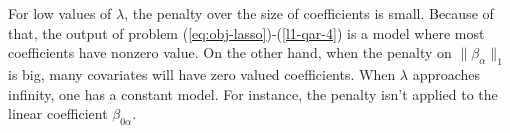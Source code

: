 


For low values of $\lambda$, the penalty over the size of coefficients is small. Because of that, the output of problem (\ref{eq:obj-lasso})-(\ref{l1-qar-4}) is a model where most coefficients have nonzero value. On the other hand, when the penalty on $\| \beta_\alpha \|_1$ is big, many covariates will have zero valued coefficients. When $\lambda$ approaches infinity, one has a constant model. 
For instance, the penalty isn't applied to the linear coefficient $\beta_{0\alpha}$. 

